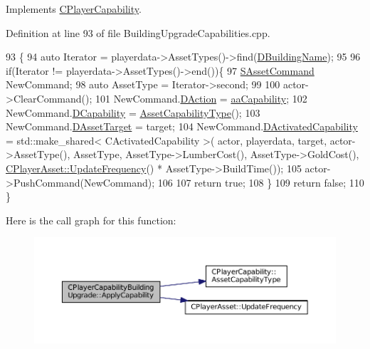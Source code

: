 Implements \hyperlink{classCPlayerCapability_a2ca6fd7fbd9c0178f1cf1d049c63825f}{C\+Player\+Capability}.



Definition at line 93 of file Building\+Upgrade\+Capabilities.\+cpp.


\begin{DoxyCode}
93                                                                                                            
                                                                   \{
94     \textcolor{keyword}{auto} Iterator = playerdata->AssetTypes()->find(\hyperlink{classCPlayerCapabilityBuildingUpgrade_a244e767a3e669441cfb03c13bf703e64}{DBuildingName});
95     
96     \textcolor{keywordflow}{if}(Iterator != playerdata->AssetTypes()->end())\{
97         \hyperlink{structSAssetCommand}{SAssetCommand} NewCommand;
98         \textcolor{keyword}{auto} AssetType = Iterator->second;
99         
100         actor->ClearCommand();
101         NewCommand.\hyperlink{structSAssetCommand_a8edd3b3d59a76d5514ba403bc8076a75}{DAction} = \hyperlink{GameDataTypes_8h_ab47668e651a3032cfb9c40ea2d60d670acf9fb164e8abd71c71f4a8c7fda360d4}{aaCapability};
102         NewCommand.\hyperlink{structSAssetCommand_a734ea7c6847457b437360f333f570ff9}{DCapability} = \hyperlink{classCPlayerCapability_a433bb196cd6ab6a932f1cac102b3aa98}{AssetCapabilityType}();
103         NewCommand.\hyperlink{structSAssetCommand_a3d9b43f6e59c386c48c41a65448a0c39}{DAssetTarget} = target;
104         NewCommand.\hyperlink{structSAssetCommand_ad8beda19520811cc70fe1eab16c774dd}{DActivatedCapability} = std::make\_shared< CActivatedCapability >(
      actor, playerdata, target, actor->AssetType(), AssetType, AssetType->LumberCost(), AssetType->GoldCost(), 
      \hyperlink{classCPlayerAsset_a0aff85b9552967a42f4f3f42cb59c19f}{CPlayerAsset::UpdateFrequency}() * AssetType->BuildTime());
105         actor->PushCommand(NewCommand);
106         
107         \textcolor{keywordflow}{return} \textcolor{keyword}{true};
108     \}
109     \textcolor{keywordflow}{return} \textcolor{keyword}{false};
110 \}
\end{DoxyCode}
Here is the call graph for this function\+:
\nopagebreak
\begin{figure}[H]
\begin{center}
\leavevmode
\includegraphics[width=350pt]{classCPlayerCapabilityBuildingUpgrade_a5e71446b74307f31ce6d6e9bbfd9a681_cgraph}
\end{center}
\end{figure}

